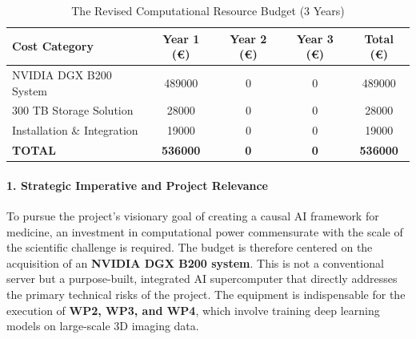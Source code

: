 \documentclass[11pt, a4paper]{article}
\begin{document}
\begin{table}[H]
\centering
\caption{The Revised Computational Resource Budget (3 Years)}
\label{tab:computational_budget}
\begin{tabular}{lS[table-format=6.0]S[table-format=6.0]S[table-format=6.0]S[table-format=6.0]}
\toprule
\textbf{Cost Category} & {\textbf{Year 1 (€)}} & {\textbf{Year 2 (€)}} & {\textbf{Year 3 (€)}} & {\textbf{Total (€)}} \\
\midrule
NVIDIA DGX B200 System & 489000 & 0 & 0 & 489000 \\
300 TB Storage Solution & 28000 & 0 & 0 & 28000 \\
Installation \& Integration & 19000 & 0 & 0 & 19000 \\
\midrule
\textbf{TOTAL} & \textbf{536000} & \textbf{0} & \textbf{0} & \textbf{536000} \\
\bottomrule
\end{tabular}
\end{table}

\paragraph{1. Strategic Imperative and Project Relevance}
To pursue the project's visionary goal of creating a causal AI framework for medicine, an investment in computational power commensurate with the scale of the scientific challenge is required. The budget is therefore centered on the acquisition of an \textbf{NVIDIA DGX B200 system}. This is not a conventional server but a purpose-built, integrated AI supercomputer that directly addresses the primary technical risks of the project. The equipment is indispensable for the execution of \textbf{WP2, WP3, and WP4}, which involve training deep learning models on large-scale 3D imaging data.
\end{document}
